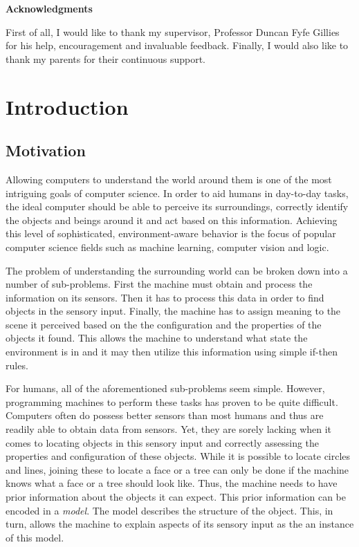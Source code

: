 \documentclass[11pt,a4paper,twoside]{report}
\begin{document}
\begin{center}
\LARGE \textbf{Acknowledgments}
\end{center}

First of all, I would like to thank my supervisor, Professor Duncan Fyfe Gillies
for his help, encouragement and invaluable feedback. Finally, I would also like to thank
my parents for their continuous support. 


\tableofcontents

\chapter{Introduction}
\section{Motivation}
Allowing computers to understand the world around them is one of the most
intriguing goals of computer science. In order to aid humans in day-to-day
tasks, the ideal computer should be able to perceive its surroundings, correctly identify the objects and beings around it and act based
on this information. Achieving this level of sophisticated, environment-aware
behavior is the focus of popular computer science fields such as machine
learning, computer vision and logic.

The problem of understanding the surrounding world can be broken down into a
number of sub-problems. First the machine must obtain and process the information on
its sensors. Then it has to process this data in order to find objects in the
sensory input. Finally, the machine has to assign meaning to the scene it perceived
based on the the configuration and the properties of the objects it found. This
allows the machine to understand what state the environment is in and it may
then utilize this information using simple if-then rules.

For humans, all of the aforementioned sub-problems seem simple. However, programming
machines to perform these tasks has proven to be quite difficult. Computers often do
possess better sensors than most humans and thus are readily able to obtain data
from sensors. Yet, they are sorely lacking when it comes to locating objects
in this sensory input and correctly assessing the properties and configuration
of these objects. While it is possible to locate circles and lines, joining
these to locate a face or a tree can only be done if the machine knows what a
face or a tree should look like. Thus, the machine needs to have prior
information about the objects it can expect. This prior information can be
encoded in a \textit{model}. The model describes the structure of the object.
This, in turn, allows the machine to explain aspects of its sensory input as the
an instance of this model.
\end{document}
